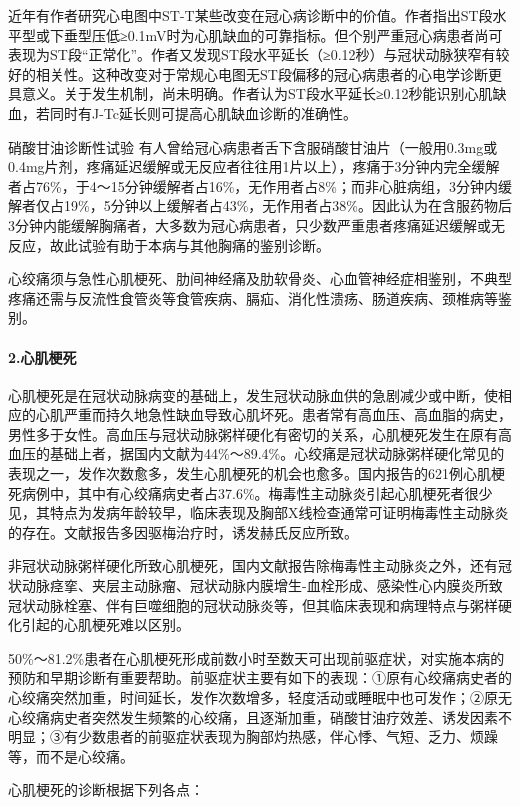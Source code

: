 近年有作者研究心电图中ST-T某些改变在冠心病诊断中的价值。作者指出ST段水平型或下垂型压低≥0.1mV时为心肌缺血的可靠指标。但个别严重冠心病患者尚可表现为ST段“正常化”。作者又发现ST段水平延长（≥0.12秒）与冠状动脉狭窄有较好的相关性。这种改变对于常规心电图无ST段偏移的冠心病患者的心电学诊断更具意义。关于发生机制，尚未明确。作者认为ST段水平延长≥0.12秒能识别心肌缺血，若同时有J-Tc延长则可提高心肌缺血诊断的准确性。

硝酸甘油诊断性试验
有人曾给冠心病患者舌下含服硝酸甘油片（一般用0.3mg或0.4mg片剂，疼痛延迟缓解或无反应者往往用1片以上），疼痛于3分钟内完全缓解者占76\%，于4～15分钟缓解者占16\%，无作用者占8\%；而非心脏病组，3分钟内缓解者仅占19\%，5分钟以上缓解者占43\%，无作用者占38\%。因此认为在含服药物后3分钟内能缓解胸痛者，大多数为冠心病患者，只少数严重患者疼痛延迟缓解或无反应，故此试验有助于本病与其他胸痛的鉴别诊断。

心绞痛须与急性心肌梗死、肋间神经痛及肋软骨炎、心血管神经症相鉴别，不典型疼痛还需与反流性食管炎等食管疾病、膈疝、消化性溃疡、肠道疾病、颈椎病等鉴别。

\paragraph{2.心肌梗死}

心肌梗死是在冠状动脉病变的基础上，发生冠状动脉血供的急剧减少或中断，使相应的心肌严重而持久地急性缺血导致心肌坏死。患者常有高血压、高血脂的病史，男性多于女性。高血压与冠状动脉粥样硬化有密切的关系，心肌梗死发生在原有高血压的基础上者，据国内文献为44\%～89.4\%。心绞痛是冠状动脉粥样硬化常见的表现之一，发作次数愈多，发生心肌梗死的机会也愈多。国内报告的621例心肌梗死病例中，其中有心绞痛病史者占37.6\%。梅毒性主动脉炎引起心肌梗死者很少见，其特点为发病年龄较早，临床表现及胸部X线检查通常可证明梅毒性主动脉炎的存在。文献报告多因驱梅治疗时，诱发赫氏反应所致。

非冠状动脉粥样硬化所致心肌梗死，国内文献报告除梅毒性主动脉炎之外，还有冠状动脉痉挛、夹层主动脉瘤、冠状动脉内膜增生-血栓形成、感染性心内膜炎所致冠状动脉栓塞、伴有巨噬细胞的冠状动脉炎等，但其临床表现和病理特点与粥样硬化引起的心肌梗死难以区别。

50\%～81.2\%患者在心肌梗死形成前数小时至数天可出现前驱症状，对实施本病的预防和早期诊断有重要帮助。前驱症状主要有如下的表现：①原有心绞痛病史者的心绞痛突然加重，时间延长，发作次数增多，轻度活动或睡眠中也可发作；②原无心绞痛病史者突然发生频繁的心绞痛，且逐渐加重，硝酸甘油疗效差、诱发因素不明显；③有少数患者的前驱症状表现为胸部灼热感，伴心悸、气短、乏力、烦躁等，而不是心绞痛。

心肌梗死的诊断根据下列各点：


